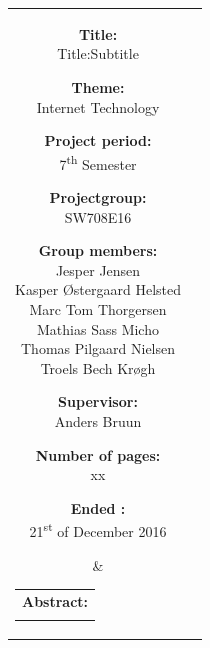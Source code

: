 \begin{titlepage}
\begin{nopagebreak}
{			\noindent
			\begin{tabular}{cc}
				\parbox[t]{.45\textwidth}{
					\vspace{.15cm}
					\begin{description}
						\item {\bf Title:}\\
						Title:Subtitle
						\item {\bf Theme:}\\
						Internet Technology
						\item {\bf Project period:}\\
							7\textsuperscript{th} Semester
			 				\hspace{4cm}
						\item {\bf Projectgroup:}\\
							SW708E16
			  				\hspace{4cm}
						\item {\bf Group members:}\\
						Jesper Jensen \\
						Kasper Østergaard Helsted \\
						Marc Tom Thorgersen \\
						Mathias Sass Micho \\
						Thomas Pilgaard Nielsen \\
						Troels Bech Krøgh
						\item {\bf Supervisor:}\\
							Anders Bruun
						\item {\bf Number of pages:}\\
							xx
						\item {\bf Ended :}\\
							21\textsuperscript{st} of December 2016
					\end{description}
				} &
				\parbox[t]{.45\textwidth}{
					\vspace{.15cm}
					\hfill
					\begin{tabular}[t]{l}
						{\bf Abstract:}\bigskip \\
						\fbox{
							\parbox{.35\textwidth}{\smallskip
								{\vfill{\small
								\smallskip}}
							}
						}
					\end{tabular}
				}
			\end{tabular}
		}
	\end{nopagebreak}
\end{titlepage}
